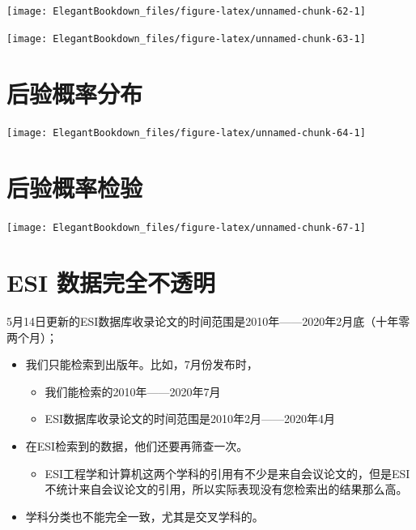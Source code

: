 \documentclass[cn, 11pt, fancy, hide]{elegantbook}
\providecommand{\tightlist}{%
  \setlength{\itemsep}{0pt}\setlength{\parskip}{0pt}}
\begin{document}
\begin{center}\texttt{[image: ElegantBookdown\_files/figure-latex/unnamed-chunk-62-1]} \end{center}

\begin{center}\texttt{[image: ElegantBookdown\_files/figure-latex/unnamed-chunk-63-1]} \end{center}

\hypertarget{ux540eux9a8cux6982ux7387ux5206ux5e03}{%
\section{后验概率分布}\label{ux540eux9a8cux6982ux7387ux5206ux5e03}}

\begin{center}\texttt{[image: ElegantBookdown\_files/figure-latex/unnamed-chunk-64-1]} \end{center}

\hypertarget{ux540eux9a8cux6982ux7387ux68c0ux9a8c}{%
\section{后验概率检验}\label{ux540eux9a8cux6982ux7387ux68c0ux9a8c}}

\begin{center}\texttt{[image: ElegantBookdown\_files/figure-latex/unnamed-chunk-67-1]} \end{center}

\hypertarget{esi-ux6570ux636eux5b8cux5168ux4e0dux900fux660e}{%
\section{ESI 数据完全不透明}\label{esi-ux6570ux636eux5b8cux5168ux4e0dux900fux660e}}

5月14日更新的ESI数据库收录论文的时间范围是2010年------2020年2月底（十年零两个月）；

\begin{itemize}
\tightlist
\item
  我们只能检索到出版年。比如，7月份发布时，

  \begin{itemize}
  \tightlist
  \item
    我们能检索的2010年------2020年7月
  \item
    ESI数据库收录论文的时间范围是2010年2月------2020年4月
  \end{itemize}
\item
  在ESI检索到的数据，他们还要再筛查一次。

  \begin{itemize}
  \tightlist
  \item
    ESI工程学和计算机这两个学科的引用有不少是来自会议论文的，但是ESI不统计来自会议论文的引用，所以实际表现没有您检索出的结果那么高。
  \end{itemize}
\item
  学科分类也不能完全一致，尤其是交叉学科的。
\end{itemize}
\end{document}
